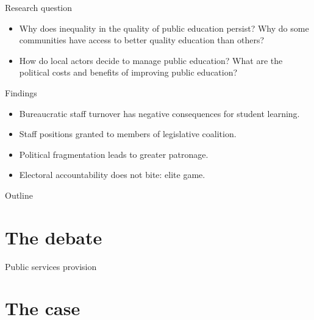 \documentclass[
  ignorenonframetext,
]{beamer}
\providecommand{\tightlist}{%
  \setlength{\itemsep}{0pt}\setlength{\parskip}{0pt}}
\begin{document}
\begin{frame}{Research question}
\protect\hypertarget{research-question}{}

\begin{itemize}
\tightlist
\item
  Why does inequality in the quality of public education persist? Why do
  some communities have access to better quality education than others?
\item
  How do local actors decide to manage public education? What are the
  political costs and benefits of improving public education?
\end{itemize}

\end{frame}

\begin{frame}{Findings}
\protect\hypertarget{findings}{}

\begin{itemize}
\tightlist
\item
  Bureaucratic staff turnover has negative consequences for student
  learning.
\item
  Staff positions granted to members of legislative coalition.
\item
  Political fragmentation leads to greater patronage.
\item
  Electoral accountability does not bite: elite game.
\end{itemize}

\end{frame}

\begin{frame}{Outline}
\protect\hypertarget{outline}{}

\tableofcontents

\end{frame}

\hypertarget{the-debate}{%
\section{The debate}\label{the-debate}}

\begin{frame}{Public services provision}
\protect\hypertarget{public-services-provision}{}

\end{frame}

\hypertarget{the-case}{%
\section{The case}\label{the-case}}
\end{document}
